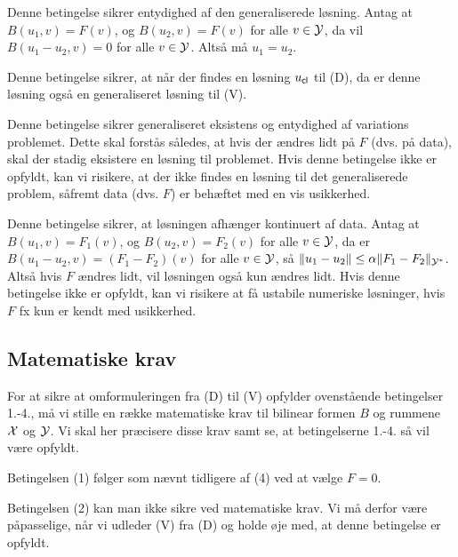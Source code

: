 \begin{adenumerate}
    \item Denne betingelse sikrer entydighed af den
          generaliserede løsning. Antag at $B(u_1,v)=F(v)$, og
          $B(u_2,v)=F(v)$ for alle $v \in \mathcal{Y}$, da vil $B(u_1-u_2,v)=0$
          for alle $v \in \mathcal{Y}$. Altså må $u_1=u_2$.
    \item Denne betingelse sikrer, at når der findes en løsning
          $u_{\mathsf{cl}}$ til (D), da er denne løsning også en generaliseret
          løsning til (V).
    \item Denne betingelse sikrer generaliseret eksistens og entydighed af
          variations problemet. Dette skal forstås således, at hvis
          der ændres lidt på $F$ (dvs. på data), skal der stadig
          eksistere en løsning til problemet. Hvis denne betingelse
          ikke er opfyldt, kan vi risikere, at der ikke findes en
          løsning til det generali\-se\-re\-de problem, såfremt data (dvs.
          $F$) er behæftet med en vis usikkerhed.
    \item Denne betingelse sikrer, at løsningen afhænger kontinuert af
	  data. Antag at $B(u_1,v)=F_1(v)$, og $B(u_2,v)=F_2(v)$ for
          alle $v \in \mathcal{Y}$, da er $B(u_1-u_2,v)=(F_1-F_2)(v)$ for
          alle $v \in \mathcal{Y}$, så 
          $\|u_1-u_2\| \leq \alpha \|F_1-F_2\|_{\mathcal{Y}^{\ast}}$. Altså
          hvis $F$ ændres lidt, vil løsningen også kun ændres lidt. Hvis
          denne betingelse ikke er opfyldt, kan vi risikere at få
          ustabile numeriske løsninger, hvis $F$ fx kun er kendt
          med usikkerhed.   
\end{adenumerate}

\subsection{Matematiske krav}
For at sikre at omformuleringen fra (D) til (V) opfylder oven\-stå\-en\-de
be\-tin\-gel\-ser 1.-4., må vi stille en række matematiske krav til
bilinear formen $B$ og rummene $\mathcal{X}$ og $\mathcal{Y}$. Vi skal her præcisere
disse krav samt se, at betingelserne 1.-4. så vil være opfyldt.

Betingelsen (1) følger som nævnt tidligere af (4) ved at vælge $F=0$.

Betingelsen (2) kan man ikke sikre ved matematiske krav. Vi må derfor
være på\-pas\-se\-li\-ge, når vi udleder (V) fra (D) og holde øje med, at denne
betingelse er opfyldt.

